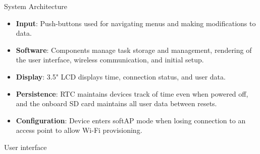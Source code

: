 \documentclass[final]{beamer}
\newlength{\colwidth}
\begin{document}
\begin{frame}[t]
\begin{columns}[t]
\begin{column}{\colwidth}
\begin{block}{System Architecture}
        \begin{itemize}
          \item \textbf{Input}: Push-buttons used for navigating menus and
            making modifications to data.
          \item \textbf{Software}: Components manage task storage and
            management, rendering of the user interface, wireless
            communication, and initial setup.
          \item \textbf{Display}: 3.5" LCD displays time, connection status,
            and user data.
          \item \textbf{Persistence}: RTC maintains devices track of time even 
            when powered off, and the onboard SD card maintains all user data
            between resets.
          \item \textbf{Configuration}: Device enters softAP mode when losing
            connection to an access point to allow Wi-Fi provisioning.
        \end{itemize}

      \end{block}

     \begin{block}{User interface}


\end{block}
\end{column}
\end{columns}
\end{frame}
\end{document}
